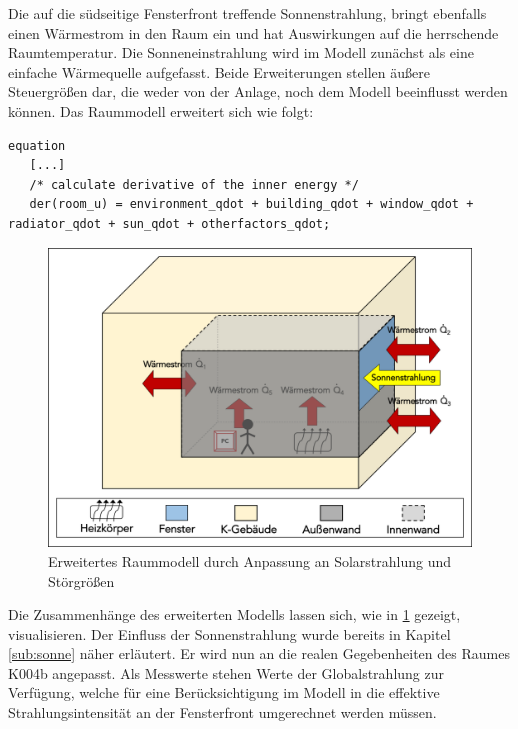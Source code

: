 Die auf die südseitige Fensterfront treffende Sonnenstrahlung, bringt ebenfalls einen Wärmestrom in den Raum ein und hat Auswirkungen auf die herrschende Raumtemperatur. Die Sonneneinstrahlung  wird im Modell zunächst als eine einfache Wärmequelle aufgefasst.
Beide Erweiterungen stellen äußere Steuergrößen dar, die weder von der Anlage, noch dem Modell beeinflusst werden können. Das Raummodell erweitert sich wie folgt:

\begin{lstlisting}[language=Modelica, caption={Erweitertes Gleichungssystem des Raummodells unter Berücksichtigung der Sonneneinstrahlung und weiterer Störgrößen},label=lst:raumdrei]
equation
   [...]
   /* calculate derivative of the inner energy */
   der(room_u) = environment_qdot + building_qdot + window_qdot + radiator_qdot + sun_qdot + otherfactors_qdot;
\end{lstlisting}

\begin{figure}
\centering
\includegraphics[width=\textwidth]{abbildungen/20160317_raumzwei}
\caption{Erweitertes Raummodell durch Anpassung an Solarstrahlung und Störgrößen}
\label{fig:raumdrei}
\end{figure}


Die Zusammenhänge des erweiterten Modells lassen sich, wie in \ref{fig:raumdrei} gezeigt, visualisieren. Der Einfluss der Sonnenstrahlung wurde bereits in Kapitel \ref{sub:sonne} näher erläutert. Er wird nun an die realen Gegebenheiten des Raumes K004b angepasst. Als Messwerte stehen Werte der Globalstrahlung zur Verfügung, welche für eine Berücksichtigung im Modell in die effektive Strahlungsintensität an der Fensterfront umgerechnet werden müssen.

